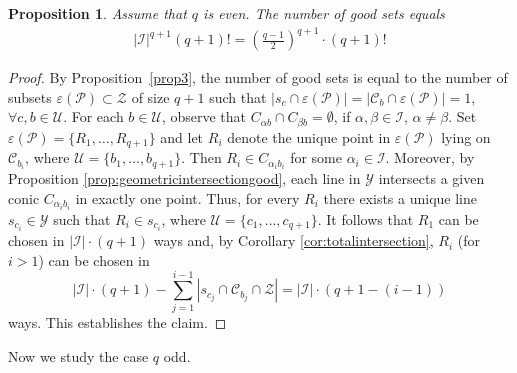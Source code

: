 \documentclass[11pt]{article}
\newtheorem{prop}[theorem]{Proposition}
\theoremstyle{definition}
\numberwithin{equation}{section}
\def\eps{\varepsilon}
\def\cC{\mathscr C}
\def\cI{\mathcal I}
\def\cP{\mathcal P}
\begin{document}
\begin{prop}\label{prop:allgoodsetseven}
    Assume that $q$ is even. The number of good sets equals  
    \begin{align*}
    \lvert \cI \rvert^{q+1} (q+1)!=\left( \frac{q-1}{2} \right)^{q+1} \cdot (q+1)!
    \end{align*}
\end{prop}
\begin{proof}
By Proposition~\ref{prop3}, the number of good sets is equal to the number of subsets $\varepsilon(\mathcal{P}) \subset \mathcal{Z}$ of size $q+1$ such that $|s_c \cap \varepsilon(\mathcal{P})| = |\cC_b \cap \varepsilon(\mathcal{P})| = 1$, $\forall c, b \in \mathcal{U}$. For each $b \in \mathcal{U}$, observe that $C_{\alpha b} \cap C_{\beta b} = \emptyset$, if $\alpha, \beta \in \cI$, $\alpha \ne \beta$. Set $\eps(\cP) = \{R_1, \dots, R_{q+1}\}$ and let $R_i$ denote the unique point in $\varepsilon(\mathcal{P})$ lying on $\cC_{b_i}$, where $\mathcal{U} = \{b_1, \ldots, b_{q+1}\}$. Then $R_i \in C_{\alpha_i b_i}$ for some $\alpha_i \in \mathcal{I}$. Moreover, by Proposition \ref{prop:geometricintersectiongood}, each line in $\mathcal{Y}$ intersects a given conic $C_{\alpha_i b_i}$ in exactly one point. Thus, for every $R_i$ there exists a unique line $s_{c_i} \in \mathcal{Y}$ such that $R_i \in s_{c_i}$, where $\mathcal{U} = \{c_1, \ldots, c_{q+1}\}$.
It follows that $R_1$ can be chosen in $|\mathcal{I}| \cdot (q+1)$ ways and, by Corollary \ref{cor:totalintersection}, $R_i$ (for $i > 1$) can be chosen in
\[
|\mathcal{I}| \cdot (q+1) - \sum_{j=1}^{i-1} |s_{c_j} \cap \cC_{b_j} \cap \mathcal{Z}| = |\mathcal{I}| \cdot (q+1 - (i - 1))
\]
ways. This establishes the claim.
\end{proof}


Now we study the case $q$ odd. 
\end{document}
